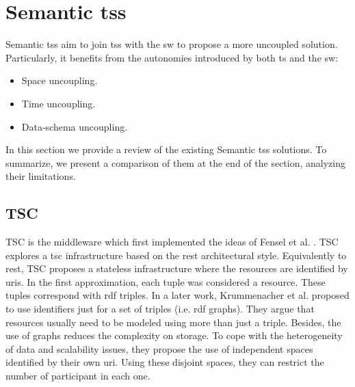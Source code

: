 \section{Semantic \aclp{ts}}
\label{sec:soa_tsc}


Semantic \aclp{ts} aim to join \aclp{ts} with the \acl{sw} to propose a more uncoupled solution.
Particularly, it benefits from the autonomies introduced by both \ac{ts} and the \ac{sw}:

\begin{itemize}
  \item Space uncoupling.
  \item Time uncoupling.
  \item Data-schema uncoupling. %
\end{itemize}


In this section we provide a review of the existing Semantic \aclp{ts} solutions. %
To summarize, we present a comparison of them at the end of the section, analyzing their limitations.




\subsection{TSC}
TSC \citep{fensel_tsc_2007} is the middleware which first implemented the ideas of Fensel et al. \citep{fensel_triple-space_2004}.
TSC explores a \acl{tsc} infrastructure based on the \ac{rest} architectural style.
Equivalently to \ac{rest}, TSC proposes a stateless infrastructure where the resources are identified by \acp{uri}.
In the first approximation, each tuple was considered a resource.
These tuples correspond with \ac{rdf} triples.
In a later work,  Krummenacher et al. \citep{krummenacher2006specification} proposed to use identifiers just for a set of triples (i.e. \ac{rdf} graphs).
They argue that resources usually need to be modeled using more than just a triple.
Besides, the use of graphs reduces the complexity on storage.
To cope with the heterogeneity of data and scalability issues, they propose the use of independent spaces identified by their own \ac{uri}.
Using these disjoint spaces, they can restrict the number of participant in each one.


